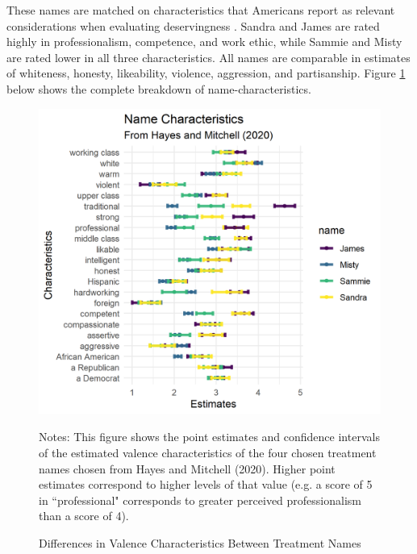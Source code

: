 \documentclass[12pt]{article}%
\begin{document}
\begin{doublespace}
These names are matched on characteristics that Americans report as relevant considerations when evaluating deservingness \citep{bobocel_justice-based_1998, katz_racial_1988, sniderman_symbolic_1986, sniderman_beyond_1996, mclosky_ethos}. Sandra and James are rated highly in professionalism, competence, and work ethic, while Sammie and Misty are rated lower in all three characteristics. All names are comparable in estimates of whiteness, honesty, likeability, violence, aggression, and partisanship. Figure \ref{characteristics} below shows the complete breakdown of name-characteristics.

\begin{figure}[h!]
	\centering
	\includegraphics[scale=.75]{figs/name-char.png}
	{\singlespacing
		\parbox{0.75\textwidth}{\scriptsize%
			Notes: This figure shows the point estimates and confidence intervals of the estimated valence characteristics of the four chosen treatment names chosen from Hayes and Mitchell (2020). Higher point estimates correspond to higher levels of that value (e.g. a score of 5 in ``professional" corresponds to greater perceived professionalism than a score of 4).
	}}
	\caption{Differences in Valence Characteristics Between Treatment Names}
	\label{characteristics}
\end{figure}


\end{doublespace}
\end{document}
